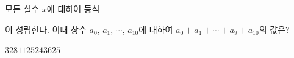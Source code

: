 모든 실수 $x$에 대하여 등식\par\smallskip{}\par{}\par\smallskip\noindent 이 성립한다. 이때 상수 $a_0$, $a_1$, $\cdots$, $a_{10}$에 대하여 $a_0+a_1+\cdots+a_9+a_{10}$의 값은?
\begin{choices32}{$32$}{$81$}{$125$}{$243$}{$625$}\end{choices32}
